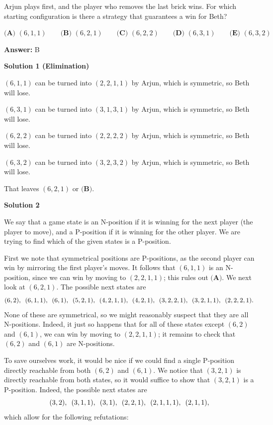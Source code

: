 \begin{enumerate}
 Arjun plays first, and the player who removes the last brick wins. For which starting configuration is there a strategy that guarantees a win for Beth?


 $\textbf{(A) }(6,1,1) \qquad \textbf{(B) }(6,2,1) \qquad \textbf{(C) }(6,2,2)\qquad \textbf{(D) }(6,3,1) \qquad \textbf{(E) }(6,3,2)$

 \textbf{Answer: }B



\textbf{Solution 1 (Elimination)}

$(6,1,1)$ can be turned into $(2,2,1,1)$ by Arjun, which is symmetric, so Beth will lose.

 $(6,3,1)$ can be turned into $(3,1,3,1)$ by Arjun, which is symmetric, so Beth will lose.

 $(6,2,2)$ can be turned into $(2,2,2,2)$ by Arjun, which is symmetric, so Beth will lose.

 $(6,3,2)$ can be turned into $(3,2,3,2)$ by Arjun, which is symmetric, so Beth will lose.

 That leaves $(6,2,1)$ or $\boxed{\textbf{(B)}}$.

 



\textbf{Solution 2}

We say that a game state is an N-position if it is winning for the next player (the player to move), and a P-position if it is winning for the other player. We are trying to find which of the given states is a P-position.

 First we note that symmetrical positions are P-positions, as the second player can win by mirroring the first player's moves. It follows that $(6, 1, 1)$ is an N-position, since we can win by moving to $(2, 2, 1, 1)$; this rules out $\textbf{(A)}$. We next look at $(6, 2, 1)$. The possible next states are
 \[(6, 2), \enskip (6, 1, 1), \enskip (6, 1), \enskip (5, 2, 1), \enskip (4, 2, 1, 1), \enskip (4, 2, 1), \enskip (3, 2, 2, 1), \enskip (3, 2, 1, 1), \enskip (2, 2, 2, 1).\]None of these are symmetrical, so we might reasonably suspect that they are all N-positions. Indeed, it just so happens that for all of these states except $(6, 2)$ and $(6, 1)$, we can win by moving to $(2, 2, 1, 1)$; it remains to check that $(6, 2)$ and $(6, 1)$ are N-positions.

 To save ourselves work, it would be nice if we could find a single P-position directly reachable from both $(6, 2)$ and $(6, 1)$. We notice that $(3, 2, 1)$ is directly reachable from both states, so it would suffice to show that $(3, 2, 1)$ is a P-position. Indeed, the possible next states are
 \[(3, 2), \enskip (3, 1, 1), \enskip (3, 1), \enskip (2, 2, 1), \enskip (2, 1, 1, 1), \enskip (2, 1, 1),\]which allow for the following refutations:


\end{enumerate}
